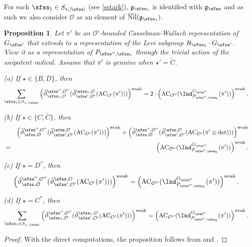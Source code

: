 \documentclass[11pt,a4paper]{amsart}
\def\abs#1{\left|{#1}\right|}
\newcommand{\CO}{{\mathcal {O}}}
\newcommand{\g}{\mathfrak g}
\numberwithin{equation}{section}
\newtheorem{prop}[thm]{Proposition}
\theoremstyle{remark}
\def\Nil{\overline{\mathrm{Nil}}}
\begin{document}
For each $\sfss_1\in S_{\star, \abs{\sfss}}$ (see \eqref{sstark}),  $\g_{\sfss_1}$ is identified with $\g_{\sfss}$ and as such we also consider $\CO$ as an element of $\Nil(\g_{\sfss_1})$.


\begin{prop}\label{prpaseq}
 Let $\pi'$ be an $\CO'$-bounded Casselman-Wallach representation of $G_{\sfss'}$ that extends to a representation of  the Levi subgroup $R_{\sfss_0}\cdot G_{\sfss'}$. View it  as a representation of $P_{\sfss'',\sfss_0}$ through the trivial action of the unipotent radical.  
Assume that $\pi'$ is genuine when $\star'=\widetilde C$.

\noindent
(a) If $ \star\in \{B,D\}$,  then
\[
   \sum_{\sfss_1\in S_{\star, \abs{\sfss}}}  \left(\check \vartheta^{\sfss'', \CO''}_{\sfss_1, \CO}(\check \vartheta^{\sfss_1, \CO}_{\sfss',\CO'}(\mathrm{AC}_{\CO'}(\pi')))\right)^{\mathrm{weak}}=2\cdot \left( \mathrm{AC}_{\CO''}(\Ind_{P_{\sfss'',\sfss_0}}^{G_{\sfss''}} (\pi'))\right)^{\mathrm{weak}}.
        \]

  \smallskip


    \noindent
(b) If $\star \in \{C, \widetilde C\}$, then
\begin{eqnarray*}
   && \left(\check \vartheta^{\sfss'', \CO''}_{\sfss, \CO}(\check \vartheta^{\sfss, \CO}_{\sfss',\CO'}(\mathrm{AC}_{\CO'}(\pi')))\right)^{\mathrm{weak}} +  \left(\check \vartheta^{\sfss'', \CO''}_{\sfss, \CO}(\check \vartheta^{\sfss, \CO}_{\sfss',\CO'}(\mathrm{AC}_{\CO'}(\pi'\otimes \det )))\right)^{\mathrm{weak}}\\
   & =&\left( \mathrm{AC}_{\CO''}(\Ind_{P_{\sfss'',\sfss_0}}^{G_{\sfss''}} (\pi'))\right)^{\mathrm{weak}}.
\end{eqnarray*}
  \smallskip

\noindent
(c) If $\star=D^*$, then
\[
 \left(\check \vartheta^{\sfss'', \CO''}_{\sfss, \CO}(\check \vartheta^{\sfss, \CO}_{\sfss',\CO'}(\mathrm{AC}_{\CO'}(\pi')))\right)^{\mathrm{weak}} = \left( \mathrm{AC}_{\CO''}(\Ind_{P_{\sfss'',\sfss_0}}^{G_{\sfss''}} (\pi'))\right)^{\mathrm{weak}}.
 \]

\smallskip

\noindent
(d) If $\star=C^*$, then
\[
  \sum _{\sfss_1\in S_{\star, \abs{\sfss}} } \left(\check \vartheta^{\sfss'', \CO''}_{\sfss_1, \CO}(\check \vartheta^{\sfss_1, \CO}_{\sfss',\CO'}(\mathrm{AC}_{\CO'}(\pi')))\right)^{\mathrm{weak}}=\left( \mathrm{AC}_{\CO''}(\Ind_{P_{\sfss'',\sfss_0}}^{G_{\sfss''}} (\pi'))\right)^{\mathrm{weak}}.
\]
\end{prop}
\begin{proof}
  With the direct computations, the proposition follows from  and  .
\end{proof}
\end{document}
